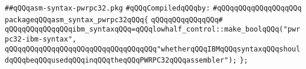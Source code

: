 \label{src/lib/compiler/back/low/pwrpc32/emit/asm-syntax-pwrpc32.pkg}
\verb|##qQQqasm-syntax-pwrpc32.pkg|\newline
\newline
\verb|#qQQqCompiledqQQqby:|\newline
\verb|#qQQqqQQqqQQqqQQqqQQq|\newline
\newline
\verb|packageqQQqasm_syntax_pwrpc32qQQq{|\newline
\verb|qQQqqQQqqQQqqQQq#|\newline
\verb|qQQqqQQqqQQqqQQqibm_syntaxqQQq=qQQqlowhalf_control::make_boolqQQq("pwrpc32-ibm-syntax",|\newline
\verb|qQQqqQQqqQQqqQQqqQQqqQQqqQQqqQQqqQQq"whetherqQQqIBMqQQqsyntaxqQQqshouldqQQqbeqQQqusedqQQqinqQQqtheqQQqPWRPC32qQQqassembler");|\newline
\newline
\verb|};|\newline

